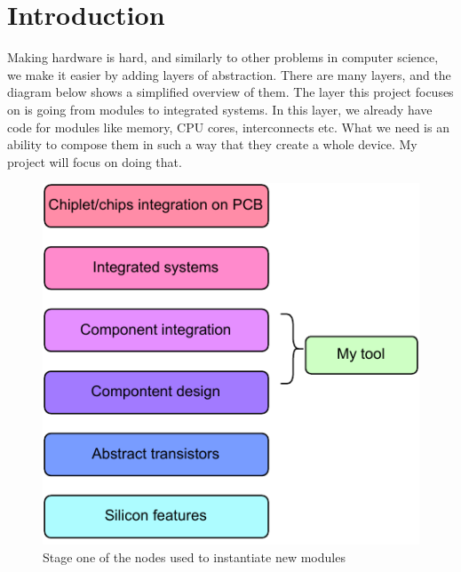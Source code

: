 \documentclass[12pt]{report}
\begin{document}
\chapter{Introduction}
Making hardware is hard, and similarly to other problems in computer science, we make it easier by adding layers of abstraction. There are many layers, and the diagram below shows a simplified overview of them. The layer this project focuses on is going from modules to integrated systems. In this layer, we already have code for modules like memory, CPU cores, interconnects etc. What we need is an ability to compose them in such a way that they create a whole device. My project will focus on doing that.
\begin{figure}[h!]
    \centering
    \includegraphics[width=0.5\columnwidth]{pdfExports/LargeMapLayersOfAbstraction.pdf}
    \caption{Stage one of the nodes used to instantiate new modules}
\end{figure}
%     
\end{document}

